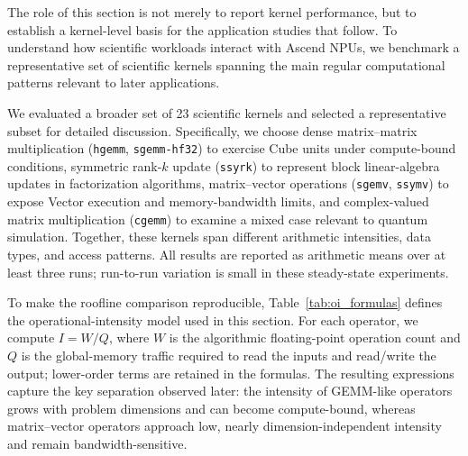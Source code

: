 \documentclass{article}
\begin{document}
The role of this section is not merely to report kernel performance, but to establish a kernel-level basis for the application studies that follow. To understand how scientific workloads interact with Ascend NPUs, we benchmark a representative set of scientific kernels spanning the main regular computational patterns relevant to later applications.

We evaluated a broader set of 23 scientific kernels and selected a representative subset for detailed discussion. Specifically, we choose  dense matrix--matrix multiplication (\texttt{hgemm}, \texttt{sgemm-hf32}) to exercise Cube units under compute-bound conditions, symmetric rank-$k$ update (\texttt{ssyrk}) to represent block linear-algebra updates in factorization algorithms, matrix--vector operations (\texttt{sgemv}, \texttt{ssymv}) to expose Vector execution and memory-bandwidth limits, and complex-valued matrix multiplication (\texttt{cgemm}) to examine a mixed case relevant to quantum simulation. Together, these kernels span different arithmetic intensities, data types, and access patterns. All results are reported as arithmetic means over at least three runs; run-to-run variation is small in these steady-state experiments.

To make the roofline comparison reproducible, Table~\ref{tab:oi_formulas} defines the operational-intensity model used in this section. For each operator, we compute $I=W/Q$, where $W$ is the algorithmic floating-point operation count and $Q$ is the global-memory traffic required to read the inputs and read/write the output; lower-order terms are retained in the formulas. The resulting expressions capture the key separation observed later: the intensity of GEMM-like operators grows with problem dimensions and can become compute-bound, whereas matrix--vector operators approach low, nearly dimension-independent intensity and remain bandwidth-sensitive.
\end{document}
